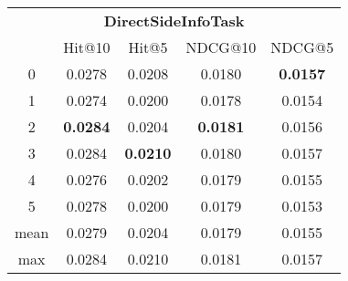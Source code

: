\documentclass{article}
\begin{document}
 

\begin{tabular}{c|cccc}

\multicolumn{5}{c}{\textbf{DirectSideInfoTask}} \\
\noalign{\smallskip}
\noalign{\smallskip}
\toprule
\multicolumn{1}{c}{Template ID} & \multicolumn{1}{|c}{Hit@10} & \multicolumn{1}{c}{Hit@5} & \multicolumn{1}{c}{NDCG@10} & \multicolumn{1}{c}{NDCG@5} \\
\midrule
0 & 0.0278 & 0.0208 & 0.0180 & \textbf{0.0157} \\
1 & 0.0274 & 0.0200 & 0.0178 & 0.0154 \\
2 & \textbf{0.0284} & 0.0204 & \textbf{0.0181} & 0.0156 \\
3 & 0.0284 & \textbf{0.0210} & 0.0180 & 0.0157 \\
4 & 0.0276 & 0.0202 & 0.0179 & 0.0155 \\
5 & 0.0278 & 0.0200 & 0.0179 & 0.0153 \\
\midrule
mean & 0.0279 & 0.0204 & 0.0179 & 0.0155 \\
max & 0.0284 & 0.0210 & 0.0181 & 0.0157 \\
\bottomrule

\end{tabular}
\end{document}
